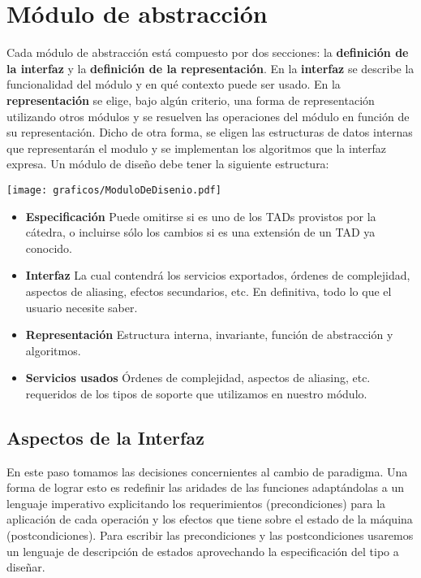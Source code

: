 \section{M\'odulo de abstracci\'on}

Cada m\'odulo de abstracci\'on est\'a compuesto por dos secciones: la \textbf{definici\'on de la interfaz} y la \textbf{definici\'on de la representaci\'on}. En la \textbf{interfaz} se describe la funcionalidad del m\'odulo y en qu\'e contexto puede ser usado. En la \textbf{representaci\'on} se elige, bajo alg\'un criterio, una forma de representaci\'on utilizando otros m\'odulos y se resuelven las operaciones del m\'odulo en funci\'on de su representaci\'on. Dicho de otra forma, se eligen las estructuras de datos internas que representar\'an el modulo y se implementan los algoritmos que la interfaz expresa. Un m\'odulo de dise\~no debe tener la siguiente estructura:

\begin{SCfigure}[1][ht!]
 \centering
 \texttt{[image: graficos/ModuloDeDisenio.pdf]}
\end{SCfigure}

\begin{itemize}
 \item \textbf{Especificaci\'on} Puede omitirse si es uno de los TADs provistos por la c\'atedra, o incluirse s\'olo los cambios si es una extensi\'on de un TAD ya conocido.
 \item \textbf{Interfaz} La cual contendr\'a los servicios exportados, \'ordenes de complejidad, aspectos de aliasing, efectos secundarios, etc. En definitiva, todo lo que el usuario necesite saber.
 \item \textbf{Representaci\'on} Estructura interna, invariante, funci\'on de abstracci\'on y algoritmos.
 \item \textbf{Servicios usados} \'Ordenes de complejidad, aspectos de aliasing, etc. requeridos de los tipos de soporte que utilizamos en nuestro m\'odulo.
\end{itemize}


\subsection{Aspectos de la Interfaz}

En este paso tomamos las decisiones concernientes al cambio de paradigma. Una forma de lograr esto es redefinir las aridades de las funciones adapt\'andolas a un lenguaje imperativo explicitando los requerimientos (precondiciones) para la aplicaci\'on de cada operaci\'on y los efectos que tiene sobre el estado de la m\'aquina (postcondiciones). Para escribir las precondiciones y las postcondiciones usaremos un lenguaje de descripci\'on de estados aprovechando la especificaci\'on del tipo a dise\~nar.

